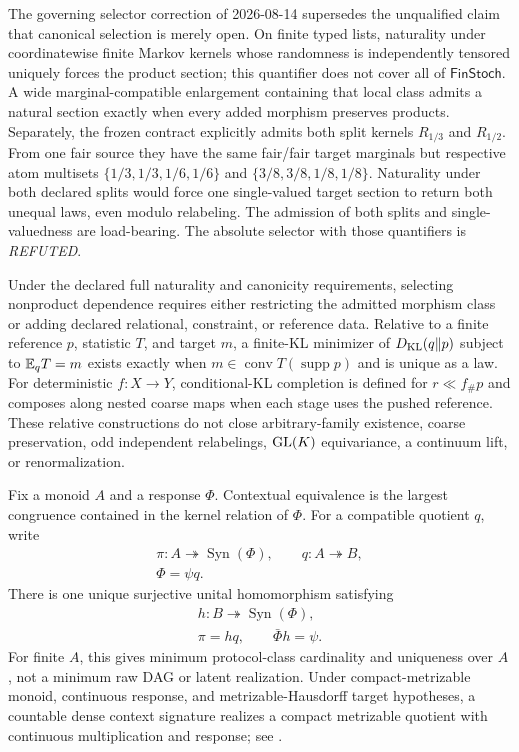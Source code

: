 \begin{description}
The governing selector correction of 2026-08-14 supersedes the unqualified
claim that canonical selection is merely open.  On finite typed lists,
naturality under coordinatewise finite Markov kernels whose randomness is
independently tensored uniquely forces the product section; this quantifier
does not cover all of \(\mathsf{FinStoch}\).  A wide marginal-compatible
enlargement containing that local class admits a natural section exactly when
every added morphism preserves products.  Separately, the frozen contract
explicitly admits both split kernels \(R_{1/3}\) and \(R_{1/2}\).  From one
fair source they have the same fair/fair target marginals but respective atom
multisets
\(\{1/3,1/3,1/6,1/6\}\) and
\(\{3/8,3/8,1/8,1/8\}\).  Naturality under both declared splits would force
one single-valued target section to return both unequal laws, even modulo
relabeling.  The admission of both splits and single-valuedness are
load-bearing.  The absolute selector with those quantifiers is
\emph{REFUTED}.

Under the declared full naturality and canonicity requirements, selecting
nonproduct dependence requires either restricting the admitted morphism class
or adding declared relational, constraint, or reference data.  Relative to a
finite reference \(p\), statistic \(T\), and
target \(m\), a finite-KL minimizer of \(D_{\mathrm{KL}}(q\Vert p)\) subject to
\(\mathbb E_qT=m\) exists exactly when
\(m\in\operatorname{conv}T(\operatorname{supp}p)\) and is unique as a law.
For deterministic \(f:X\to Y\), conditional-KL completion is defined for
\(r\ll f_\#p\) and composes along nested coarse maps when each stage uses
the pushed reference.  These relative constructions do not close
arbitrary-family existence, coarse preservation, odd independent relabelings,
\(\mathrm{GL}(K)\) equivariance, a continuum lift, or renormalization.

\item[Operational intervention quotient and nonidentifiability (established).]
Fix a monoid \(A\) and a response \(\Phi\).  Contextual equivalence is the
largest congruence contained in the kernel relation of \(\Phi\).  For a
compatible quotient \(q\), write
\[
\begin{gathered}
\pi:A\twoheadrightarrow\operatorname{Syn}(\Phi),\qquad
q:A\twoheadrightarrow B,\\
\Phi=\psi q.
\end{gathered}
\]
There is one unique surjective unital homomorphism satisfying
\[
\begin{gathered}
h:B\twoheadrightarrow\operatorname{Syn}(\Phi),\\
\pi=hq,\qquad \bar\Phi h=\psi.
\end{gathered}
\]
For finite \(A\), this gives minimum
protocol-class cardinality and uniqueness over \(A\), not a minimum raw
DAG or latent realization.  Under compact-metrizable monoid, continuous
response, and metrizable-Hausdorff target hypotheses, a countable dense
context signature realizes a compact metrizable quotient with continuous
multiplication and response; see
.


\end{description}
